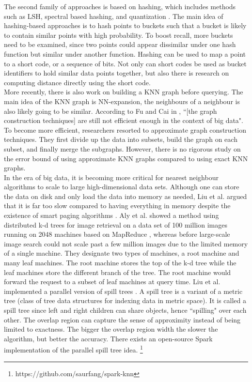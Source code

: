\documentclass[letterpaper,twocolumn,10pt]{article}
\theoremstyle{definition}
\begin{document}
The second family of approaches is based on hashing, which includes methods such as 
LSH, spectral based hashing, and quantization \cite{wang2014hashing}. The main idea 
of hashing-based approaches is to hash points to buckets such that a bucket is 
likely to contain similar points with high probability. To boost recall, more 
buckets need to be examined, since two points could appear dissimilar under one 
hash 
function but similar under another function. Hashing can be used to map a point to 
a short code, or a sequence of bits. Not only can short codes be used as bucket 
identifiers to hold similar data points together, but also there is research on 
computing distance directly using the short code. \\

More recently, there is also work on building a KNN graph before querying. The main 
idea of the KNN graph is NN-expansion, the neighbours of a neighbour is also likely 
going to be similar. According to Fu and Cai in \cite{fu2016efanna}, ``[the 
graph construction techniques] are still not efficient enough in the context  of  
big data". To become more efficient, researchers resorted to approximate graph 
construction techniques. They first divide up the data into subsets, build the 
graph on each subset, and finally merge the subgraphs. However, there is no 
rigorous study on the error bound of using approximate KNN graphs compared to using 
exact KNN graphs. \\

In the era of big data, it is becoming more critical for nearest neighbour 
algorithms to scale to large high-dimensional data sets. Although one can store the 
data on disk and only load the data into memory as needed, Liu et al. argued that 
it is far too slow compared to having everything in memory despite the existence of 
smart paging algorithms \cite{liu2007clustering}. Aly et al. showed a method 
using distributed k-d trees for image retrieval on a data set of 100 million images 
running on 2048 machines based on MapReduce \cite{aly2011distributed}, whereas 
before large-scale 
image search could not scale past a few million images due to the limited memory of 
a single machine. They designate two types of machines, a root machine and many 
leaf machines. The root machine stores the top of the k-d tree while the leaf 
machines store the different branch of the tree. The root machine would forward the 
request to a subset of leaf machines at query time. Liu et al. implemented a 
parallel version of spill trees \cite{liu2007clustering}. A spill tree is a variant 
of a metric tree (class of tree data structures for indexing data in metric space). 
It is called a spill tree since left and right children can share objects, hence 
``spilling" over each other. The overlap region can capture the sense of 
approximity instead of being limited to exactness. The bigger the overlap region 
width the slower the algorithm, but better the accuracy. There exists an 
open-source Spark implementation of the parallel spill tree idea. 
\footnote{https://github.com/saurfang/spark-knn} \\
\end{document}
